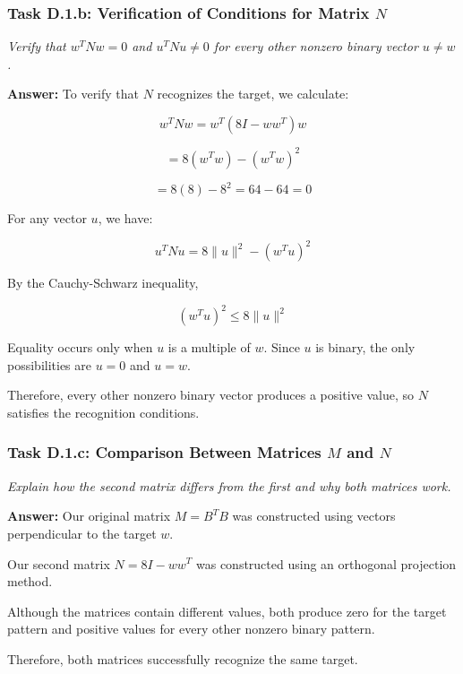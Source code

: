 \documentclass[11pt]{article}
\begin{document}
\newpage

\subsubsection*{Task D.1.b: Verification of Conditions for Matrix $N$}
\textit{Verify that $w^T N w = 0$ and $u^T N u \neq 0$ for every other nonzero binary vector $u \neq w$.}

\vspace{0.4em}
\textbf{Answer:} 
To verify that $N$ recognizes the target, we calculate:

\[
w^TNw = w^T(8I - ww^T)w
\]

\[
= 8(w^Tw) - (w^Tw)^2
\]

\[
= 8(8) - 8^2 = 64 - 64 = 0
\]

For any vector $u$, we have:

\[
u^TNu = 8\|u\|^2 - (w^Tu)^2
\]

By the Cauchy-Schwarz inequality,

\[
(w^Tu)^2 \leq 8\|u\|^2
\]

Equality occurs only when $u$ is a multiple of $w$.
Since $u$ is binary, the only possibilities are
$u = 0$ and $u = w$.

Therefore, every other nonzero binary vector
produces a positive value, so $N$ satisfies
the recognition conditions.

\vspace{0.5em}

\subsubsection*{Task D.1.c: Comparison Between Matrices $M$ and $N$}
\textit{Explain how the second matrix differs from the first and why both matrices work.}

\vspace{0.4em}
\textbf{Answer:} 
Our original matrix $M = B^TB$ was constructed
using vectors perpendicular to the target $w$.

Our second matrix $N = 8I - ww^T$ was constructed
using an orthogonal projection method.

Although the matrices contain different values,
both produce zero for the target pattern and
positive values for every other nonzero binary
pattern.

Therefore, both matrices successfully recognize
the same target.
\end{document}
